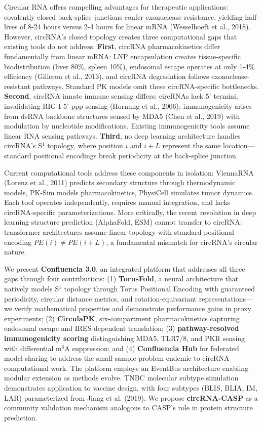 \documentclass[12pt,a4paper]{article}
\begin{document}
Circular RNA offers compelling advantages for therapeutic applications: covalently closed back-splice junctions confer exonuclease resistance, yielding half-lives of 8-24 hours versus 2-4 hours for linear mRNA (Wesselhoeft et al., 2018). However, circRNA's closed topology creates three computational gaps that existing tools do not address. \textbf{First}, circRNA pharmacokinetics differ fundamentally from linear mRNA: LNP encapsulation creates tissue-specific biodistribution (liver 80\%, spleen 10\%), endosomal escape operates at only 1-4\% efficiency (Gilleron et al., 2013), and circRNA degradation follows exonuclease-resistant pathways. Standard PK models omit these circRNA-specific bottlenecks. \textbf{Second}, circRNA innate immune sensing differs: circRNAs lack 5' termini, invalidating RIG-I 5'-ppp sensing (Hornung et al., 2006); immunogenicity arises from dsRNA backbone structures sensed by MDA5 (Chen et al., 2019) with modulation by nucleotide modifications. Existing immunogenicity tools assume linear RNA sensing pathways. \textbf{Third}, no deep learning architecture handles circRNA's S$^1$ topology, where position $i$ and $i+L$ represent the same location—standard positional encodings break periodicity at the back-splice junction.

Current computational tools address these components in isolation: ViennaRNA (Lorenz et al., 2011) predicts secondary structure through thermodynamic models, PK-Sim models pharmacokinetics, PhysiCell simulates tumor dynamics. Each tool operates independently, requires manual integration, and lacks circRNA-specific parameterizations. More critically, the recent revolution in deep learning structure prediction (AlphaFold, ESM) cannot transfer to circRNA: transformer architectures assume linear topology with standard positional encoding $PE(i) \neq PE(i+L)$, a fundamental mismatch for circRNA's circular nature.

We present \textbf{Confluencia 3.0}, an integrated platform that addresses all three gaps through four contributions: (1) \textbf{TorusFold}, a neural architecture that natively models S$^1$ topology through Torus Positional Encoding with guaranteed periodicity, circular distance metrics, and rotation-equivariant representations—we verify mathematical properties and demonstrate performance gains in proxy experiments; (2) \textbf{CirculaPK}, six-compartment pharmacokinetics capturing endosomal escape and IRES-dependent translation; (3) \textbf{pathway-resolved immunogenicity scoring} distinguishing MDA5, TLR7/8, and PKR sensing with differential m$^6$A suppression; and (4) \textbf{Confluencia Hub} for federated model sharing to address the small-sample problem endemic to circRNA computational work. The platform employs an EventBus architecture enabling modular extension as methods evolve. TNBC molecular subtype simulation demonstrates application to vaccine design, with four subtypes (BLIS, BLIA, IM, LAR) parameterized from Jiang et al. (2019). We propose \textbf{circRNA-CASP} as a community validation mechanism analogous to CASP's role in protein structure prediction.
\end{document}
